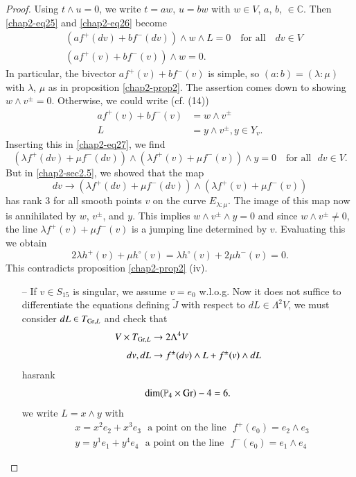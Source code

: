 \begin{proof}
Using $t\wedge u=0$, we write $t=aw$, $u=bw$ with $w\in V$, $a$, $b$,
$\in \mathbb{C}$. Then \eqref{chap2-eq25} and \eqref{chap2-eq26}
become
\begin{align}
& (af^{+}(dv)+bf^{-}(dv))\wedge w\wedge L=0\quad\text{for all}\quad
dv\in V\label{chap2-eq27}\\[4pt]
& (af^{+}(v)+bf^{-}(v))\wedge w=0.\label{chap2-eq28}
\end{align}
In particular, the bivector $af^{+}(v)+bf^{-}(v)$ is simple, so
$(a:b)=(\lambda:\mu)$ with $\lambda$, $\mu$ as in
proposition \ref{chap2-prop2}. The assertion comes down to showing
$w\wedge v^{\pm}=0$. Otherwise, we could write (cf. (14))
\begin{align*}
af^{+}(v)+bf^{-}(v) &= w\wedge v^{\pm}\\[4pt]
L &= y\wedge v^{\pm}, y\in Y_{v}.
\end{align*}\pageoriginale
Inserting this in \eqref{chap2-eq27}, we find
$$
(\lambda f^{+}(dv)+\mu f^{-}(dv))\wedge (\lambda f^{+}(v)+\mu
f^{-}(v))\wedge y=0\text{~~ for all~~}dv\in V.
$$
But in \eqref{chap2-sec2.5}, we showed that the map
$$
dv\to (\lambda f^{+}(dv)+\mu f^{-}(dv))\wedge (\lambda f^{+}(v)+\mu f^{-}(v))
$$
has rank 3 for all smooth points $v$ on the curve
$E_{\lambda:\mu}$. The image of this map now is annihilated by $w$,
$v^{\pm}$, and $y$. This implies $w\wedge v^{\pm}\wedge y=0$ and since
$w\wedge v^{\pm}\neq 0$, the line $\lambda f^{+}(v)+\mu f^{-}(v)$ is a
jumping line determined by $v$. Evaluating this we obtain 
$$
2\lambda h^{+}(v)+\mu h^{\circ}(v)=\lambda h^{\circ}(v)+2\mu h^{-}(v)=0.
$$
This contradicts proposition \ref{chap2-prop2} (iv).
\begin{itemize}
\item[--] If $v\in S_{15}$ is singular, we assume $v=e_{0}$
w.l.o.g. Now it does not suffice to differentiate the equations
defining $\widetilde{J}$ with respect to $dL\in \Lambda^{2}V$, we must
consider $dL\in T_{\operatorname{Gr},L}$ and check that
\begin{align*}
V\times T_{\operatorname{Gr},L} &\to 2\Lambda^{4}V\\[4pt]
dv,dL &\to f^{\pm}(dv)\wedge L+f^{\pm}(v)\wedge dL
\end{align*}
has\pageoriginale rank
$$
\dim (\mathbb{P}_{4}\times \operatorname{Gr})-4=6.
$$
we write $L=x\wedge y$ with
\begin{align*}
& x=x^{2}e_{2}+x^{3}e_{3}\text{~ a point on the line~ }
f^{+}(e_{0})=e_{2}\wedge e_{3}\\[4pt]
& y=y^{1}e_{1}+y^{4}e_{4}\text{~ a point on the line~ }
f^{-}(e_{0})=e_{1}\wedge e_{4}

\end{align*}
\end{itemize}
\end{proof}
